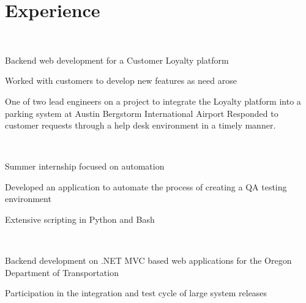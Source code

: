 \documentclass[]{hieudo-build}
\begin{document}
\hfill
\begin{minipage}[t]{0.69\textwidth} 

\section{Experience}

\\
\vspace{0.9em} %
\begin{tightemize}
\item Backend web development for a Customer Loyalty platform
\item Worked with customers to develop new features as need arose
\item One of two lead engineers on a project to integrate the Loyalty platform into a parking system at Austin Bergstorm International Airport
\tiem Responded to customer requests through a help desk environment in a timely manner.
\end{tightemize}

\sectionsep

 \\
\begin{tightemize}
\item Summer internship focused on automation
\item Developed an application to automate the process of creating a QA testing environment
\item Extensive scripting in Python and Bash
\end{tightemize}

\sectionsep

 \\
\begin{tightemize}
\item Backend development on .NET MVC based web applications for the Oregon Department of Transportation
\item Participation in the integration
and test cycle of large system releases
\end{tightemize}
\sectionsep



\end{minipage}
\end{document}

